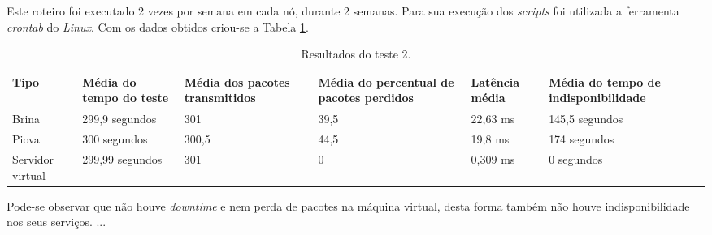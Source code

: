 Este roteiro foi executado 2 vezes por semana em cada nó, durante 2 semanas. Para sua execução dos \textit{scripts} foi utilizada a ferramenta 
\textit{crontab} do \textit{Linux}. Com os dados obtidos criou-se a Tabela \ref{tab:teste2resultados}.


\begin{table}[h!]
\caption{Resultados do teste 2.}
\label{tab:teste2resultados}
\begin{center}
\begin{tabular}{|l|p{2.2cm}|p{2.5cm}|p{2.5cm}|p{1.5cm}|p{3cm}|}\hline
\textbf{Tipo} & \textbf{Média do tempo do teste} & \textbf{Média dos pacotes transmitidos} & \textbf{Média do percentual de pacotes perdidos} & \textbf{Latência média} & \textbf{Média do tempo de indisponibilidade} \\\hline
Brina & 299,9 segundos & 301 & 39,5 & 22,63 ms & 145,5 segundos \\\hline
Piova & 300 segundos & 300,5 & 44,5 & 19,8 ms & 174 segundos\\\hline
Servidor virtual & 299,99 segundos & 301 & 0 & 0,309 ms & 0 segundos \\\hline
\end{tabular}
\end{center}
\end{table}

Pode-se observar que não houve \textit{downtime} e nem perda de pacotes na máquina virtual, desta forma também não houve indisponibilidade nos 
seus serviços.
...

